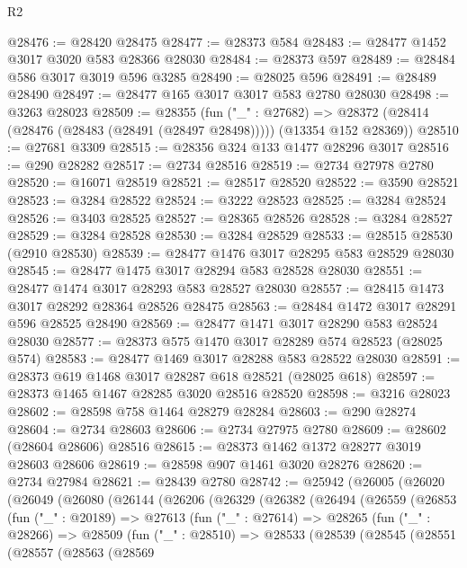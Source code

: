 \begin{lexlean}{R2}
\begin{coremodule}
@28476 := @28420 @28475
@28477 := @28373 @584
@28483 := @28477 @1452 @3017 @3020 @583 @28366 @28030
@28484 := @28373 @597
@28489 := @28484 @586 @3017 @3019 @596 @3285
@28490 := @28025 @596
@28491 := @28489 @28490
@28497 := @28477 @165 @3017 @3017 @583 @2780 @28030
@28498 := @3263 @28023
@28509 := @28355
    (fun ("_" : @27682) =>
    @28372 (@28414 (@28476 (@28483 (@28491 (@28497 @28498))))) (@13354 @152 @28369))
@28510 := @27681 @3309
@28515 := @28356 @324 @133 @1477 @28296 @3017
@28516 := @290 @28282
@28517 := @2734 @28516
@28519 := @2734 @27978 @2780
@28520 := @16071 @28519
@28521 := @28517 @28520
@28522 := @3590 @28521
@28523 := @3284 @28522
@28524 := @3222 @28523
@28525 := @3284 @28524
@28526 := @3403 @28525
@28527 := @28365 @28526
@28528 := @3284 @28527
@28529 := @3284 @28528
@28530 := @3284 @28529
@28533 := @28515 @28530 (@2910 @28530)
@28539 := @28477 @1476 @3017 @28295 @583 @28529 @28030
@28545 := @28477 @1475 @3017 @28294 @583 @28528 @28030
@28551 := @28477 @1474 @3017 @28293 @583 @28527 @28030
@28557 := @28415 @1473 @3017 @28292 @28364 @28526 @28475
@28563 := @28484 @1472 @3017 @28291 @596 @28525 @28490
@28569 := @28477 @1471 @3017 @28290 @583 @28524 @28030
@28577 := @28373 @575 @1470 @3017 @28289 @574 @28523 (@28025 @574)
@28583 := @28477 @1469 @3017 @28288 @583 @28522 @28030
@28591 := @28373 @619 @1468 @3017 @28287 @618 @28521 (@28025 @618)
@28597 := @28373 @1465 @1467 @28285 @3020 @28516 @28520
@28598 := @3216 @28023
@28602 := @28598 @758 @1464 @28279 @28284
@28603 := @290 @28274
@28604 := @2734 @28603
@28606 := @2734 @27975 @2780
@28609 := @28602 (@28604 @28606) @28516
@28615 := @28373 @1462 @1372 @28277 @3019 @28603 @28606
@28619 := @28598 @907 @1461 @3020 @28276
@28620 := @2734 @27984
@28621 := @28439 @2780
@28742 := @25942
    (@26005
      (@26020
        (@26049
          (@26080
            (@26144
              (@26206
                (@26329
                  (@26382
                    (@26494
                      (@26559
                        (@26853
                          (fun ("_" : @20189) =>
                          @27613
                            (fun ("_" : @27614) =>
                            @28265
                              (fun ("_" : @28266) =>
                              @28509
                                (fun ("_" : @28510) =>
                                @28533
                                  (@28539
                                    (@28545
                                      (@28551
                                        (@28557
                                          (@28563
                                            (@28569

\end{coremodule}
\end{lexlean}
